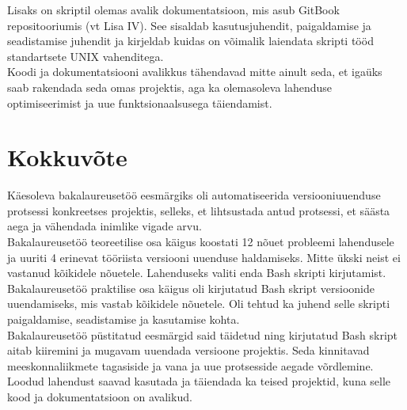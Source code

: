 \documentclass[12pt]{report}
\begin{document}
  Lisaks on skriptil  olemas avalik dokumentatsioon, mis asub GitBook repositooriumis (vt Lisa IV). See sisaldab kasutusjuhendit, paigaldamise ja seadistamise juhendit ja kirjeldab kuidas on võimalik laiendata skripti tööd standartsete UNIX vahenditega.\\
  
  Koodi ja dokumentatsiooni avalikkus tähendavad mitte ainult seda, et igaüks saab rakendada seda omas projektis, aga ka olemasoleva lahenduse optimiseerimist ja uue funktsionaalsusega täiendamist.
  
  \newpage
  
  \section*{Kokkuvõte}
  \label{kokkuvote}
  
  Käesoleva bakalaureusetöö eesmärgiks oli automatiseerida versiooniuuenduse protsessi konkreetses projektis, selleks, et lihtsustada antud protsessi, et säästa aega ja vähendada inimlike vigade arvu.\\
  
  Bakalaureusetöö teoreetilise osa käigus koostati 12 nõuet probleemi lahendusele ja uuriti 4 erinevat tööriista versiooni uuenduse haldamiseks. Mitte ükski neist ei vastanud kõikidele nõuetele. Lahenduseks valiti enda Bash skripti kirjutamist.\\
  
  Bakalaureusetöö praktilise osa käigus oli kirjutatud Bash skript versioonide uuendamiseks, mis vastab kõikidele nõuetele. Oli tehtud ka juhend selle skripti paigaldamise, seadistamise ja kasutamise kohta.\\
  
  Bakalaureusetöö püstitatud eesmärgid said täidetud ning kirjutatud Bash skript aitab kiiremini ja mugavam uuendada versioone projektis. Seda kinnitavad meeskonnaliikmete tagasiside ja vana ja uue protsesside aegade võrdlemine.\\
  
  Loodud lahendust saavad kasutada ja täiendada ka teised projektid, kuna selle kood ja dokumentatsioon on avalikud.

  \newpage
  
\end{document}
